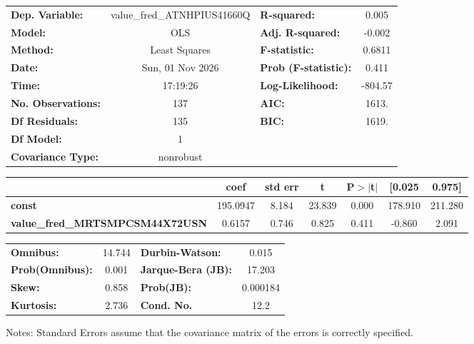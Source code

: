 \begin{center}
\begin{tabular}{lclc}
\toprule
\textbf{Dep. Variable:}                 & value\_fred\_ATNHPIUS41660Q & \textbf{  R-squared:         } &     0.005   \\
\textbf{Model:}                         &             OLS             & \textbf{  Adj. R-squared:    } &    -0.002   \\
\textbf{Method:}                        &        Least Squares        & \textbf{  F-statistic:       } &    0.6811   \\
\textbf{Date:}                          &       Sun, 01 Nov 2026      & \textbf{  Prob (F-statistic):} &    0.411    \\
\textbf{Time:}                          &           17:19:26          & \textbf{  Log-Likelihood:    } &   -804.57   \\
\textbf{No. Observations:}              &               137           & \textbf{  AIC:               } &     1613.   \\
\textbf{Df Residuals:}                  &               135           & \textbf{  BIC:               } &     1619.   \\
\textbf{Df Model:}                      &                 1           & \textbf{                     } &             \\
\textbf{Covariance Type:}               &          nonrobust          & \textbf{                     } &             \\
\bottomrule
\end{tabular}
\begin{tabular}{lcccccc}
                                        & \textbf{coef} & \textbf{std err} & \textbf{t} & \textbf{P$> |$t$|$} & \textbf{[0.025} & \textbf{0.975]}  \\
\midrule
\textbf{const}                          &     195.0947  &        8.184     &    23.839  &         0.000        &      178.910    &      211.280     \\
\textbf{value\_fred\_MRTSMPCSM44X72USN} &       0.6157  &        0.746     &     0.825  &         0.411        &       -0.860    &        2.091     \\
\bottomrule
\end{tabular}
\begin{tabular}{lclc}
\textbf{Omnibus:}       & 14.744 & \textbf{  Durbin-Watson:     } &    0.015  \\
\textbf{Prob(Omnibus):} &  0.001 & \textbf{  Jarque-Bera (JB):  } &   17.203  \\
\textbf{Skew:}          &  0.858 & \textbf{  Prob(JB):          } & 0.000184  \\
\textbf{Kurtosis:}      &  2.736 & \textbf{  Cond. No.          } &     12.2  \\
\bottomrule
\end{tabular}
\end{center}

Notes: \newline
 [1] Standard Errors assume that the covariance matrix of the errors is correctly specified.